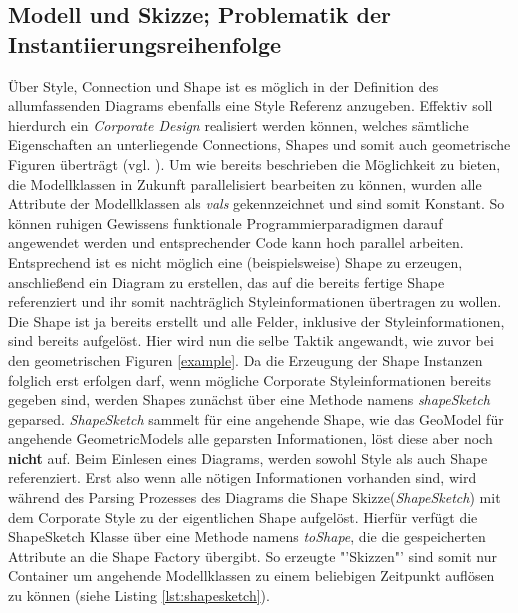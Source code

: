 \subsection{Modell und Skizze; Problematik der Instantiierungsreihenfolge}\label{skizze}
Über Style, Connection und Shape  ist es möglich in der Definition des allumfassenden Diagrams ebenfalls eine Style Referenz anzugeben. Effektiv soll hierdurch ein \textit{Corporate Design} realisiert werden können, welches sämtliche Eigenschaften an unterliegende Connections, Shapes und somit auch geometrische Figuren überträgt (vgl. ). Um wie bereits beschrieben die Möglichkeit zu bieten, die Modellklassen in Zukunft parallelisiert bearbeiten zu können, wurden alle Attribute der Modellklassen als \textit{vals} gekennzeichnet und sind somit Konstant. So können ruhigen Gewissens funktionale Programmierparadigmen darauf angewendet werden und entsprechender Code kann hoch parallel arbeiten. Entsprechend ist es nicht möglich eine (beispielsweise) Shape zu erzeugen, anschließend ein Diagram zu erstellen, das auf die bereits fertige Shape referenziert und ihr somit nachträglich Styleinformationen übertragen zu wollen. Die Shape ist ja bereits erstellt und alle Felder, inklusive der Styleinformationen, sind bereits aufgelöst. Hier wird nun die selbe Taktik angewandt, wie zuvor bei den geometrischen Figuren \ref{example}. Da die Erzeugung der Shape Instanzen folglich erst erfolgen darf, wenn mögliche Corporate Styleinformationen bereits gegeben sind, werden Shapes zunächst über eine Methode namens \textit{shapeSketch} geparsed. \textit{ShapeSketch} sammelt für eine angehende Shape, wie das GeoModel für angehende GeometricModels alle geparsten Informationen, löst diese aber noch \textbf{nicht} auf. Beim Einlesen eines Diagrams, werden sowohl Style als auch Shape referenziert. Erst also wenn alle nötigen Informationen vorhanden sind, wird während des Parsing Prozesses des Diagrams die Shape Skizze(\textit{ShapeSketch}) mit dem Corporate Style zu der eigentlichen Shape aufgelöst. Hierfür verfügt die ShapeSketch Klasse über eine Methode namens \textit{toShape}, die die gespeicherten Attribute an die Shape Factory übergibt. So erzeugte "'Skizzen"' sind somit nur Container um angehende Modellklassen zu einem beliebigen Zeitpunkt auflösen zu können (siehe Listing \ref{lst:shapesketch}).
